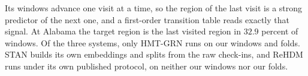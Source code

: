 Its
windows advance one visit at a time, so the region of the last visit is a strong predictor
of the next one, and a first-order transition table reads exactly that signal. At Alabama the target region is the last visited region in $32.9$ percent of
windows.
Of the three systems, only HMT-GRN runs on our windows and folds. STAN builds its own embeddings and splits from the raw check-ins, and ReHDM runs under
its own published protocol, on neither our windows nor our folds.

